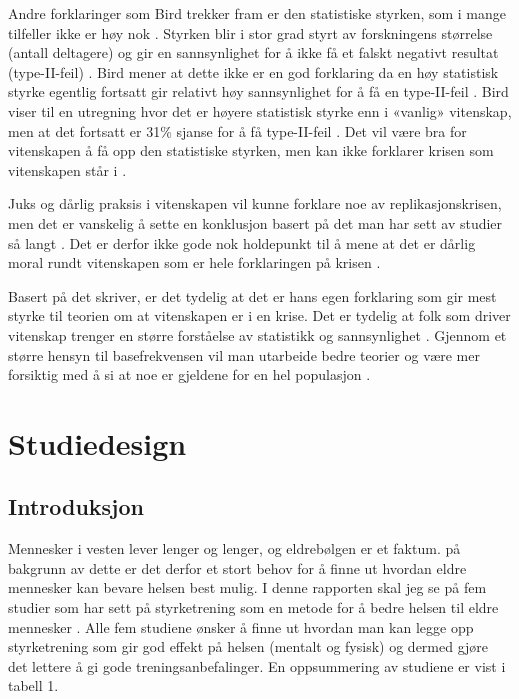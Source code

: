 \documentclass[
]{book}
\begin{document}
Andre forklaringer som Bird trekker fram er den statistiske styrken, som i mange tilfeller ikke er høy nok \citep{bird2020}. Styrken blir i stor grad styrt av forskningens størrelse (antall deltagere) og gir en sannsynlighet for å ikke få et falskt negativt resultat (type-II-feil) \citep{bird2020}. Bird mener at dette ikke er en god forklaring da en høy statistisk styrke egentlig fortsatt gir relativt høy sannsynlighet for å få en type-II-feil \citep{bird2020}. Bird viser til en utregning hvor det er høyere statistisk styrke enn i «vanlig» vitenskap, men at det fortsatt er 31\% sjanse for å få type-II-feil \citep[s. 12-14]{bird2020}. Det vil være bra for vitenskapen å få opp den statistiske styrken, men kan ikke forklarer krisen som vitenskapen står i \citep{bird2020}.

Juks og dårlig praksis i vitenskapen vil kunne forklare noe av replikasjonskrisen, men det er vanskelig å sette en konklusjon basert på det man har sett av studier så langt \citep{bird2020}. Det er derfor ikke gode nok holdepunkt til å mene at det er dårlig moral rundt vitenskapen som er hele forklaringen på krisen \citep{bird2020}.

Basert på det \citet{bird2020} skriver, er det tydelig at det er hans egen forklaring som gir mest styrke til teorien om at vitenskapen er i en krise. Det er tydelig at folk som driver vitenskap trenger en større forståelse av statistikk og sannsynlighet \citep{bird2020}. Gjennom et større hensyn til basefrekvensen vil man utarbeide bedre teorier og være mer forsiktig med å si at noe er gjeldene for en hel populasjon \citep{bird2020}.

\hypertarget{studiedesign}{%
\chapter{Studiedesign}\label{studiedesign}}

\hypertarget{introduksjon-1}{%
\section{Introduksjon}\label{introduksjon-1}}

Mennesker i vesten lever lenger og lenger, og eldrebølgen er et faktum. på bakgrunn av dette er det derfor et stort behov for å finne ut hvordan eldre mennesker kan bevare helsen best mulig. I denne rapporten skal jeg se på fem studier som har sett på styrketrening som en metode for å bedre helsen til eldre mennesker \citep{geirsdottir2012, schott2019, turpela2017, vikberg2019, vincent2002}. Alle fem studiene ønsker å finne ut hvordan man kan legge opp styrketrening som gir god effekt på helsen (mentalt og fysisk) og dermed gjøre det lettere å gi gode treningsanbefalinger. En oppsummering av studiene er vist i tabell 1.
\end{document}
